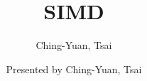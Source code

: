 \documentclass{beamer}
\title{SIMD}
\author{
    Ching-Yuan, Tsai\inst{1}
}
\institute{
	\inst{1} NTU CSIE R05922135
}
\date{
    \tiny{Presented by Ching-Yuan, Tsai}
}
\begin{document}
\begin{frame}
    \titlepage
\end{frame}



\end{document}
